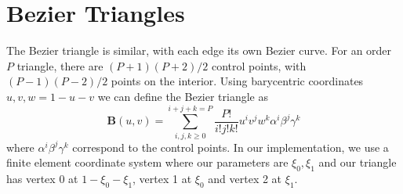 \documentclass{article}
\begin{document}
\section{Bezier Triangles}
The Bezier triangle is similar, with each edge its own Bezier curve. For an order $P$ triangle, there are $(P+1)(P+2)/2$ control points, with $(P-1)(P-2)/2$ points on the interior. Using barycentric coordinates $u,v,w = 1-u-v$ we can define the Bezier triangle as 
\[
\mathbf{B}(u,v) = \displaystyle\sum_{i,j,k\geq 0}^{i+j+k=P} \frac{P!}{i!j!k!}u^iv^jw^k \alpha^i\beta^j\gamma^k 
\]
where $\alpha^i\beta^j\gamma^k$ correspond to the control points. In our implementation, we use a finite element coordinate system where our parameters are $\xi_0,\xi_1$ and our triangle has vertex 0 at $1-\xi_0-\xi_1$, vertex 1 at $\xi_0$ and vertex 2 at $\xi_1$.
\end{document}
